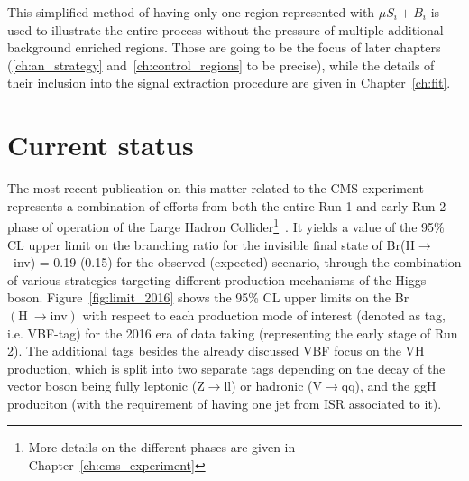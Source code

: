 \hspace{10pt} This simplified method of having only one region represented with $\mu S_i+B_i$ is used to illustrate the entire process without the pressure of multiple additional background enriched regions. Those are going to be the focus of later chapters (\ref{ch:an_strategy} and~\ref{ch:control_regions} to be precise), while the details of their inclusion into the signal extraction procedure are given in Chapter~\ref{ch:fit}.

\section{Current status}
\hspace{10pt} The most recent publication on this matter related to the CMS experiment represents a combination of efforts from both the entire Run 1  and early Run 2 phase of operation of the Large Hadron Collider\footnote{More details on the different phases are given in Chapter~\ref{ch:cms_experiment}}~\cite{paper:HIG_17_023}. It yields a value of the 95\% CL upper limit on the branching ratio for the invisible final state of Br(H$\rightarrow$~inv) = 0.19 (0.15) for the observed (expected) scenario, through the combination of various strategies targeting different production mechanisms of the Higgs boson. Figure~\ref{fig:limit_2016} shows the 95\% CL upper limits on the Br$(\text{H}~\rightarrow \text{inv})$ with respect to each production mode of interest (denoted as tag, i.e. VBF-tag) for the 2016 era of data taking (representing the early stage of Run 2). The additional tags besides the already discussed VBF focus on the VH production, which is split into two separate tags depending on the decay of the vector boson being fully leptonic (Z$\rightarrow$ll) or hadronic (V$\rightarrow$qq), and the ggH produciton (with the requirement of having one jet from ISR associated to it).


